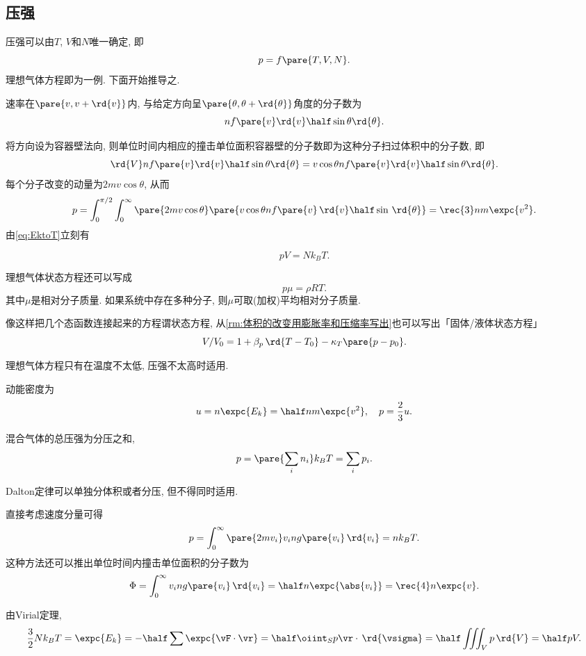 \documentclass[../Thermal.tex]{subfiles}
\begin{document}
\subsection{压强}
压强可以由$T$, $V$和$N$唯一确定, 即
\[ p = f\pare{T, V, N}. \]
理想气体方程即为一例. 下面开始推导之.
\begin{finale}
速率在$\pare{v, v+\rd{v}}$内, 与给定方向呈$\pare{\theta, \theta+\rd{\theta}}$角度的分子数为
\[ nf\pare{v}\rd{v}\half\sin\theta\rd{\theta}. \]
\end{finale}
将方向设为容器壁法向, 则单位时间内相应的撞击单位面积容器壁的分子数即为这种分子扫过体积中的分子数, 即
\[ \rd{V} nf\pare{v}\rd{v}\half\sin\theta\rd{\theta} = v\cos\theta nf\pare{v}\rd{v}\half\sin\theta\rd{\theta}. \]
每个分子改变的动量为$2mv\cos\theta$, 从而
\[ p=\int_0^{\pi/2}\int_0^\infty \pare{2mv\cos\theta}\pare{v\cos\theta nf\pare{v}\,\rd{v}\half\sin\,\rd{\theta}} = \rec{3}nm\expc{v^2}. \]
由\eqref{eq:EktoT}立刻有
\begin{finale}
\[ pV = Nk_B T. \]
\end{finale}
\begin{remark}
	理想气体状态方程还可以写成
	\[ p\mu = \rho RT. \]
	其中$\mu$是相对分子质量. 如果系统中存在多种分子, 则$\mu$可取(加权)平均相对分子质量.
\end{remark}
\begin{remark}
	像这样把几个态函数连接起来的方程谓状态方程, 从\cref{rm:体积的改变用膨胀率和压缩率写出}也可以写出「固体/液体状态方程」
	\[ V/V_0 = 1 + \beta_p\,\rd{T-T_0} - \kappa_T\pare{p-p_0}. \]
\end{remark}
\begin{pitfall}
	理想气体方程只有在温度不太低, 压强不太高时适用.
\end{pitfall}
动能密度为
\[ u = n\expc{E_k} = \half nm\expc{v^2},\quad p=\frac{2}{3}u. \]
\begin{finale}
\begin{axiom}[Dalton定律]
混合气体的总压强为分压之和,
\[ p = \pare{\sum_i n_i} k_B T = \sum_i p_i. \]
\end{axiom}
\end{finale}
\begin{pitfall}
Dalton定律可以单独分体积或者分压, 但不得同时适用.
\end{pitfall}
\begin{remark}[另一推导]
直接考虑速度分量可得
\[ p =\int_0^\infty \pare{2mv_i}v_ing\pare{v_i}\,\rd{v_i} = nk_BT. \]
这种方法还可以推出单位时间内撞击单位面积的分子数为
\[ \Phi = \int_0^\infty v_i ng\pare{v_i}\,\rd{v_i} = \half n\expc{\abs{v_i}} = \rec{4} n\expc{v}. \]
\end{remark}
\begin{remark}[从Virial定理推导]
由Virial定理,
\[ \frac{3}{2}Nk_BT = \expc{E_k} = -\half \sum\expc{\vF\cdot\vr} = \half \oiint_S p\vr\cdot\,\rd{\vsigma} = \half \iiint_V p\,\rd{V} = \half pV. \]
\end{remark}
\end{document}
